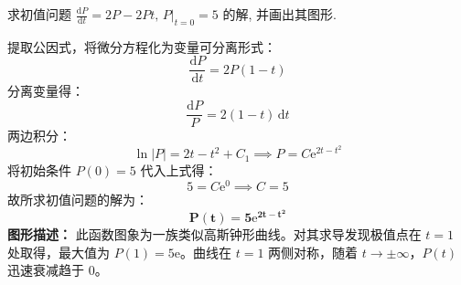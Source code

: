\documentclass[lang=cn,11pt]{elegantbook}
\begin{document}
\begin{exercise}[求解方程]
求初值问题 $\displaystyle \frac{\mathrm{d}P}{\mathrm{d}t}=2P-2Pt,\,P\big|_{t=0}=5$ 的解, 并画出其图形.
\end{exercise}
\begin{solution}
提取公因式，将微分方程化为变量可分离形式：
\[
\frac{\mathrm{d}P}{\mathrm{d}t} = 2P(1-t)
\]
分离变量得：
\[
\frac{\mathrm{d}P}{P} = 2(1-t)\,\mathrm{d}t
\]
两边积分：
\[
\ln|P| = 2t - t^2 + C_1 \implies P = C\mathrm{e}^{2t-t^2}
\]
将初始条件 $P(0) = 5$ 代入上式得：
\[
5 = C\mathrm{e}^{0} \implies C = 5
\]
故所求初值问题的解为：
\[
\mathbf{P(t) = 5\mathrm{e}^{2t-t^2}}
\]
\textbf{图形描述：} 此函数图象为一族类似高斯钟形曲线。对其求导发现极值点在 $t=1$ 处取得，最大值为 $P(1) = 5\mathrm{e}$。曲线在 $t=1$ 两侧对称，随着 $t \to \pm\infty$，$P(t)$ 迅速衰减趋于 $0$。
\end{solution}
\end{document}
